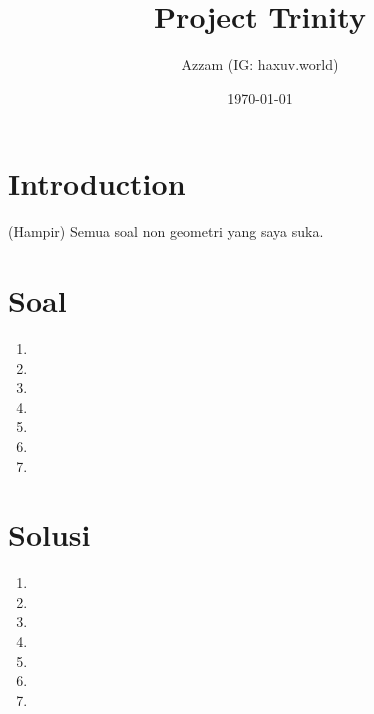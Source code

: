 \documentclass[11pt]{scrartcl}
\title{Project Trinity}
\author{Azzam (IG: haxuv.world)}
\date{\today}
\begin{document}
\maketitle

\section{Introduction}
(Hampir) Semua soal non geometri yang saya suka. 

\section{Soal}
\begin{enumerate}
    \item 
    \item 
    \item 
    \item 
    \item 
    \item 
    \item 
\end{enumerate}

\newpage
\section{Solusi}
\begin{enumerate}
    \item 
    \newpage
    \item 
    \newpage
    \item 
    \newpage
    \item 
    \newpage
    \item 
    \newpage
    \item 
    \newpage
    \item 
    \newpage
    
\end{enumerate}
\end{document}
